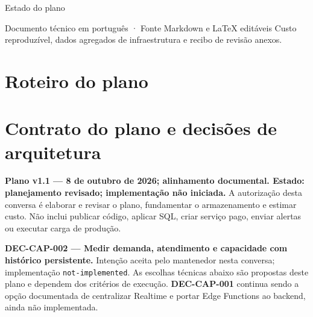 \documentclass[10pt,a4paper]{article}
\newcommand{\smallnote}[1]{\par{\footnotesize\color{NFMuted}#1\par}}
\begin{document}
\begin{titlepage}
\begin{NFBox}{Estado do plano}
\end{NFBox}
\vspace{2mm}
\begin{center}
\end{center}
\vfill
\smallnote{Documento técnico em português · Fonte Markdown e LaTeX editáveis\newline
Custo reproduzível, dados agregados de infraestrutura e recibo de revisão anexos.}
\end{titlepage}
\setcounter{page}{2}
\section*{Roteiro do plano}
\begingroup
\setlength{\parskip}{0pt}
\fontsize{9}{11.5}\selectfont
\makeatletter
\renewcommand{\l@section}{\@dottedtocline{1}{0pt}{1.7em}}
\makeatother
\tableofcontents
\endgroup
\clearpage
\fontsize{9.5}{12.1}\selectfont
\clearpage
\section{Contrato do plano e decisões de
arquitetura}\label{contrato-do-plano-e-decisuxf5es-de-arquitetura}

\textbf{Plano v1.1 --- 8 de outubro de 2026; alinhamento documental.
Estado: planejamento revisado; implementação não iniciada.} A
autorização desta conversa é elaborar e revisar o plano, fundamentar o
armazenamento e estimar custo. Não inclui publicar código, aplicar SQL,
criar serviço pago, enviar alertas ou executar carga de produção.

\textbf{DEC-CAP-002 --- Medir demanda, atendimento e capacidade com
histórico persistente.} Intenção aceita pelo mantenedor nesta conversa;
implementação {\footnotesize\ttfamily\nolinkurl{not-implemented}}. As escolhas técnicas abaixo são
propostas deste plano e dependem dos critérios de execução.
\textbf{DEC-CAP-001} continua sendo a opção documentada de centralizar
Realtime e portar Edge Functions ao backend, ainda não implementada.
\end{document}
